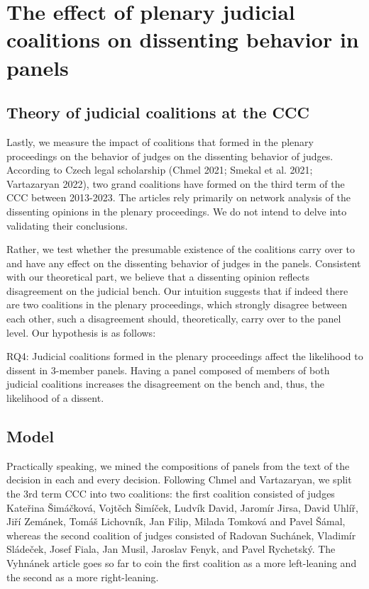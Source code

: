 \documentclass[
  11pt,
]{article}
\begin{document}
\hypertarget{the-effect-of-plenary-judicial-coalitions-on-dissenting-behavior-in-panels}{%
\section{The effect of plenary judicial coalitions on dissenting
behavior in
panels}\label{the-effect-of-plenary-judicial-coalitions-on-dissenting-behavior-in-panels}}

\hypertarget{theory-of-judicial-coalitions-at-the-ccc}{%
\subsection{Theory of judicial coalitions at the
CCC}\label{theory-of-judicial-coalitions-at-the-ccc}}

Lastly, we measure the impact of coalitions that formed in the plenary
proceedings on the behavior of judges on the dissenting behavior of
judges. According to Czech legal scholarship (Chmel 2021; Smekal et al.
2021; Vartazaryan 2022), two grand coalitions have formed on the third
term of the CCC between 2013-2023. The articles rely primarily on
network analysis of the dissenting opinions in the plenary proceedings.
We do not intend to delve into validating their conclusions.

Rather, we test whether the presumable existence of the coalitions carry
over to and have any effect on the dissenting behavior of judges in the
panels. Consistent with our theoretical part, we believe that a
dissenting opinion reflects disagreement on the judicial bench. Our
intuition suggests that if indeed there are two coalitions in the
plenary proceedings, which strongly disagree between each other, such a
disagreement should, theoretically, carry over to the panel level. Our
hypothesis is as follows:

RQ4: Judicial coalitions formed in the plenary proceedings affect the
likelihood to dissent in 3-member panels. Having a panel composed of
members of both judicial coalitions increases the disagreement on the
bench and, thus, the likelihood of a dissent.

\hypertarget{model-2}{%
\subsection{Model}\label{model-2}}

Practically speaking, we mined the compositions of panels from the text
of the decision in each and every decision. Following Chmel and
Vartazaryan, we split the 3rd term CCC into two coalitions: the first
coalition consisted of judges Kateřina Šimáčková, Vojtěch Šimíček,
Ludvík David, Jaromír Jirsa, David Uhlíř, Jiří Zemánek, Tomáš Lichovník,
Jan Filip, Milada Tomková and Pavel Šámal, whereas the second coalition
of judges consisted of Radovan Suchánek, Vladimír Sládeček, Josef Fiala,
Jan Musil, Jaroslav Fenyk, and Pavel Rychetský. The Vyhnánek article
goes so far to coin the first coalition as a more left-leaning and the
second as a more right-leaning.
\end{document}
